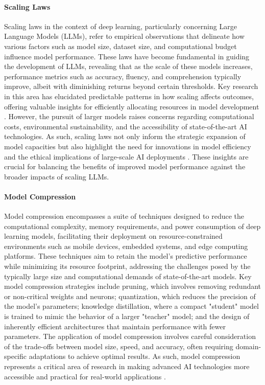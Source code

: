\documentclass{article}
\begin{document}
\paragraph{Scaling Laws}
Scaling laws in the context of deep learning, particularly concerning Large Language Models (LLMs), refer to empirical observations that delineate how various factors such as model size, dataset size, and computational budget influence model performance. These laws have become fundamental in guiding the development of LLMs, revealing that as the scale of these models increases, performance metrics such as accuracy, fluency, and comprehension typically improve, albeit with diminishing returns beyond certain thresholds. Key research in this area has elucidated predictable patterns in how scaling affects outcomes, offering valuable insights for efficiently allocating resources in model development \cite{KaplanEtAl2020}. However, the pursuit of larger models raises concerns regarding computational costs, environmental sustainability, and the accessibility of state-of-the-art AI technologies. As such, scaling laws not only inform the strategic expansion of model capacities but also highlight the need for innovations in model efficiency and the ethical implications of large-scale AI deployments \cite{ThompsonEtAl2020}. These insights are crucial for balancing the benefits of improved model performance against the broader impacts of scaling LLMs.

\paragraph{Model Compression}
Model compression encompasses a suite of techniques designed to reduce the computational complexity, memory requirements, and power consumption of deep learning models, facilitating their deployment on resource-constrained environments such as mobile devices, embedded systems, and edge computing platforms. These techniques aim to retain the model's predictive performance while minimizing its resource footprint, addressing the challenges posed by the typically large size and computational demands of state-of-the-art models. Key model compression strategies include pruning, which involves removing redundant or non-critical weights and neurons; quantization, which reduces the precision of the model's parameters; knowledge distillation, where a compact "student" model is trained to mimic the behavior of a larger "teacher" model; and the design of inherently efficient architectures that maintain performance with fewer parameters. The application of model compression involves careful consideration of the trade-offs between model size, speed, and accuracy, often requiring domain-specific adaptations to achieve optimal results. As such, model compression represents a critical area of research in making advanced AI technologies more accessible and practical for real-world applications \cite{ChengEtAl2017, HintonVinyalsDean2015}.
\end{document}
